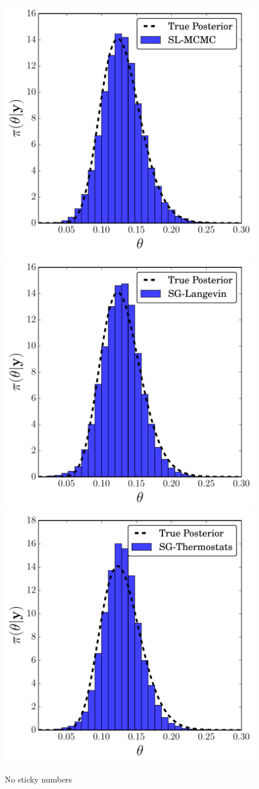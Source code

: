 \documentclass[]{article}
\begin{document}
\begin{figure}[t]
\begin{center}
\includegraphics[width=0.32\columnwidth]{./images/exp-SL-MCMC-posterior-hist-omega-rate-0p01-chain0.pdf}
\includegraphics[width=0.32\columnwidth]{./images/exp-SG-Langevin-posterior-hist-omega-rate-0p01-chain0.pdf}
\includegraphics[width=0.32\columnwidth]{./images/exp-SG-Thermostats-posterior-hist-omega-rate-0p01-chain0.pdf}

\caption{\small{No sticky numbers}}
\label{fig:exp-posteriors}
\end{center}
\vskip -0.2in
\end{figure} 
%
\end{document}
